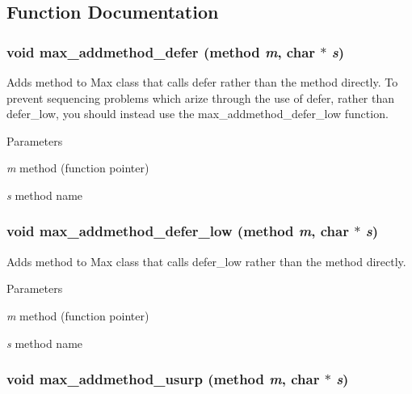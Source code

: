 \subsection{Function Documentation}
\hypertarget{group__maxwrapmod_ga02ff83d357bb73bc66662f2b7686694d}{
\subsubsection[{max\_\-addmethod\_\-defer}]{\setlength{\rightskip}{0pt plus 5cm}void max\_\-addmethod\_\-defer ({\bf method} {\em m}, \/  char $\ast$ {\em s})}}
\label{group__maxwrapmod_ga02ff83d357bb73bc66662f2b7686694d}


Adds method to Max class that calls defer rather than the method directly. To prevent sequencing problems which arize through the use of defer, rather than defer\_\-low, you should instead use the max\_\-addmethod\_\-defer\_\-low function.


\begin{DoxyParams}{Parameters}
\item[{\em m}]method (function pointer) \item[{\em s}]method name \end{DoxyParams}
\hypertarget{group__maxwrapmod_gac057d2e8d94686363fa9ae8ea0b41fee}{
\subsubsection[{max\_\-addmethod\_\-defer\_\-low}]{\setlength{\rightskip}{0pt plus 5cm}void max\_\-addmethod\_\-defer\_\-low ({\bf method} {\em m}, \/  char $\ast$ {\em s})}}
\label{group__maxwrapmod_gac057d2e8d94686363fa9ae8ea0b41fee}


Adds method to Max class that calls defer\_\-low rather than the method directly. 
\begin{DoxyParams}{Parameters}
\item[{\em m}]method (function pointer) \item[{\em s}]method name \end{DoxyParams}
\hypertarget{group__maxwrapmod_gac3983a058208aaf0b4d1800ce8c41b1a}{
\subsubsection[{max\_\-addmethod\_\-usurp}]{\setlength{\rightskip}{0pt plus 5cm}void max\_\-addmethod\_\-usurp ({\bf method} {\em m}, \/  char $\ast$ {\em s})}}
\label{group__maxwrapmod_gac3983a058208aaf0b4d1800ce8c41b1a}


